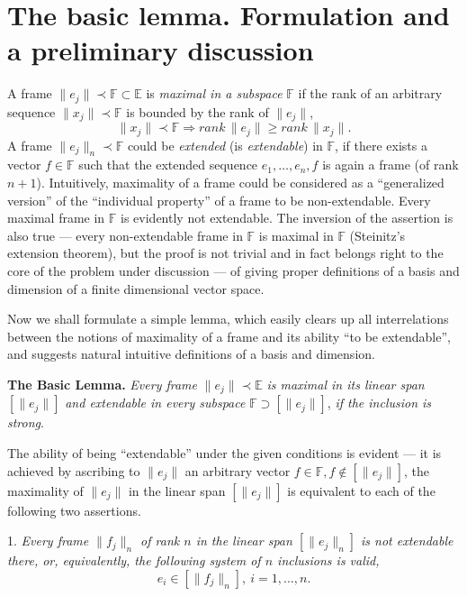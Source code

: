 \documentclass[]{amsart}
\begin{document}
  
 \section{The basic lemma. Formulation and a preliminary discussion} 
   \noindent A frame $\|e_j\|\prec \mathbb F\subset\mathbb E$ is \emph{maximal in a subspace} $\mathbb F$ if the rank of an arbitrary sequence $\|x_j\|\prec \mathbb F$ is bounded by the rank of $\|e_j\|$,
 \[
 \|x_j\|\prec\mathbb F\Longrightarrow rank\, \|e_j\|\ge rank\, \|x_j\|.
 \]
A frame $\|e_j\|_n\prec\mathbb F$ could be \emph{extended} (is \emph{extendable}) in $\mathbb F$,  if there exists a vector $f\in\mathbb F$ such that the extended sequence $e_1,\ldots,e_n,f$ is again a frame (of rank $n+1$).
Intuitively,  maximality of a frame could be considered as a ``generalized version'' of the ``individual property'' of a frame to be non-extendable. Every maximal frame in $\mathbb F$ is evidently not extendable. The inversion of the assertion is also true --- every non-extendable frame in $\mathbb F$ is maximal in $\mathbb F$ (Steinitz's extension theorem), but the proof is not trivial and in fact  belongs right to the core of the  problem under discussion --- of giving  proper definitions of a basis and dimension of a finite dimensional vector space.

\noindent
 { Now we} 
shall formulate 
 a simple lemma, which easily clears up all inter\-relations between the notions of maximality of a frame and its ability ``to be extendable'', and suggests     natural intuitive definitions of a basis and dimension.

\noindent
 {\bf The Basic Lemma.} \emph {Every frame} $\|e_j\|\prec\mathbb E$ \emph{is maximal in its linear span}
$[\|e_j\|]$ \emph{and extendable in every subspace} $\mathbb F\supset [\|e_j\|] $,  \emph{if the inclusion is strong}.

\noindent
The ability of being ``extendable''  under the given conditions is evident --- it is achieved by ascribing to $\|e_j\|$ 
 an arbitrary vector $f\in\mathbb F, f\notin [\|e_j\|]$,  the maximality of $\|e_j\|$ in the linear span $[\|e_j\|]$ is equivalent to each of the following two assertions.

1. \emph{Every frame $\|f_j\|_n$ of rank $n$    in the linear span $[\|e_j\|_n]$ is not extendable there, or, equivalently, the following system of $n$ inclusions is valid,}
\begin{equation}
\label{INCL}
e_i\in[\|f_j\|_n], \ i=1,\ldots,n.
\end{equation}
\end{document}
